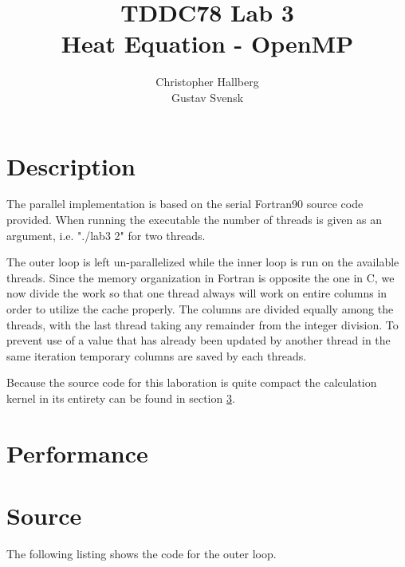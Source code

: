 \documentclass[a4paper, 12pt]{article}
\begin{document}
\title{TDDC78 Lab 3\\
        Heat Equation - OpenMP}
\author{Christopher Hallberg \\
        Gustav Svensk}
\maketitle

\thispagestyle{empty}

\newpage
\setcounter{page}{1}
\tableofcontents
\newpage

\section{Description}
The parallel implementation is based on the serial Fortran90 source code
provided. When running the executable the number of threads is given as
an argument, i.e. "./lab3 2" for two threads.

The outer loop is left un-parallelized while the inner loop is run on the
available threads. Since the memory organization in Fortran is opposite the one
in C, we now divide the work so that one thread always will work on entire
columns in order to utilize the cache properly. The columns are divided equally
among the threads, with the last thread taking any remainder from the integer
division. To prevent use of a value that has already been updated by another
thread in the same iteration temporary columns are saved by each threads.

Because the source code for this laboration is quite compact the
calculation kernel in its entirety can be found in section \ref{sec:src}.

\section{Performance}

\newpage
\section{Source}
\label{sec:src}
The following listing shows the code for the outer loop.
\end{document}
